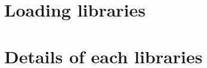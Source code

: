 \documentclass[a4paper]{article}
\newcommand{\PkgName}{\textsf{WTMath}}
\newcommand{\Meta}[1]{$\langle$\mbox{}{\normalfont\textit{#1}}\mbox{}$\rangle$}
\newenvironment{syntax}{\begin{quote}\small}{\end{quote}}
\begin{document}
\section{Loading libraries}

%

\section{Details of each libraries}

%
%
%
%
%
\end{document}
